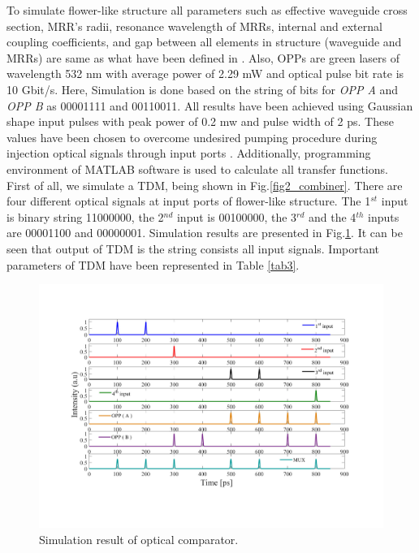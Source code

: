 \documentclass{osa-article}
\begin{document}
To simulate flower-like structure all parameters such as effective waveguide cross section, MRR’s radii, resonance wavelength of MRRs, internal and external coupling coefficients, and gap between all elements in structure (waveguide and MRRs)  are same as what have been defined in \cite{lalehsimulation}. Also, OPPs are green lasers of wavelength 532 nm with average power of 2.29 mW and optical pulse bit rate is 10 Gbit/s. Here, Simulation is done based on the string of bits for \textit{OPP A} and \textit{OPP B} as 00001111 and 00110011. All results have been achieved using Gaussian shape input pulses with peak power of 0.2 mw and pulse width of 2 ps. These values have been chosen to overcome undesired pumping procedure during injection optical signals through input ports \cite{lalehsimulation}. Additionally, programming environment of MATLAB software is used to calculate all transfer functions.
First of all, we simulate a TDM, being shown in Fig.\ref{fig2_combiner}. There are four different optical signals at input ports of flower-like structure. The 1$^{st}$ input is binary string 11000000, the 2$^{nd}$ input is 00100000, the 3$^{rd}$ and the 4$^{th}$ inputs are 00001100 and 00000001. Simulation results are presented in Fig.\ref{fig3_muxfi}. It can be seen that output of TDM is the string consists all input signals. Important parameters of TDM have been represented in Table \ref{tab3}.
\begin{figure}[tb]
\centering
\includegraphics[width=5 in]{figs/fig3_muxfi.pdf}
	\caption{Simulation result of optical comparator.}
	\label{fig3_muxfi}
\end{figure}
\end{document}
